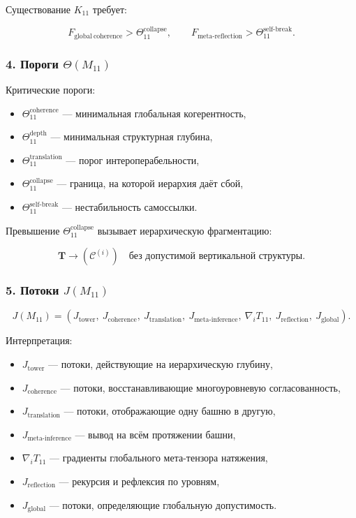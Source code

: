 Существование $K_{11}$ требует:

\[
F_{\mathrm{global\ coherence}} > \Theta_{11}^{\mathrm{collapse}},
\qquad
F_{\mathrm{meta\mbox{-}reflection}} > \Theta_{11}^{\mathrm{self\mbox{-}break}}.
\]

\subsubsection*{4. Пороги $\Theta(M_{11})$}

Критические пороги:

\begin{itemize}
    \item $\Theta_{11}^{\mathrm{coherence}}$ — минимальная глобальная когерентность,
    \item $\Theta_{11}^{\mathrm{depth}}$ — минимальная структурная глубина,
    \item $\Theta_{11}^{\mathrm{translation}}$ — порог интероперабельности,
    \item $\Theta_{11}^{\mathrm{collapse}}$ — граница, на которой иерархия даёт сбой,
    \item $\Theta_{11}^{\mathrm{self\mbox{-}break}}$ — нестабильность самоссылки.
\end{itemize}

Превышение $\Theta_{11}^{\mathrm{collapse}}$ вызывает иерархическую фрагментацию:

\[
\mathbf{T} \to (\mathcal{C}^{(i)}) \quad \text{без допустимой вертикальной структуры}.
\]

\subsubsection*{5. Потоки $J(M_{11})$}

\[
J(M_{11}) =
(
J_{\mathrm{tower}},\
J_{\mathrm{coherence}},\
J_{\mathrm{translation}},\
J_{\mathrm{meta\mbox{-}inference}},\
\nabla_i T_{11},\
J_{\mathrm{reflection}},\
J_{\mathrm{global}}
).
\]

Интерпретация:

\begin{itemize}
    \item $J_{\mathrm{tower}}$ — потоки, действующие на иерархическую глубину,
    \item $J_{\mathrm{coherence}}$ — потоки, восстанавливающие многоуровневую согласованность,
    \item $J_{\mathrm{translation}}$ — потоки, отображающие одну башню в другую,
    \item $J_{\mathrm{meta\mbox{-}inference}}$ — вывод на всём протяжении башни,
    \item $\nabla_i T_{11}$ — градиенты глобального мета-тензора натяжения,
    \item $J_{\mathrm{reflection}}$ — рекурсия и рефлексия по уровням,
    \item $J_{\mathrm{global}}$ — потоки, определяющие глобальную допустимость.
\end{itemize}


